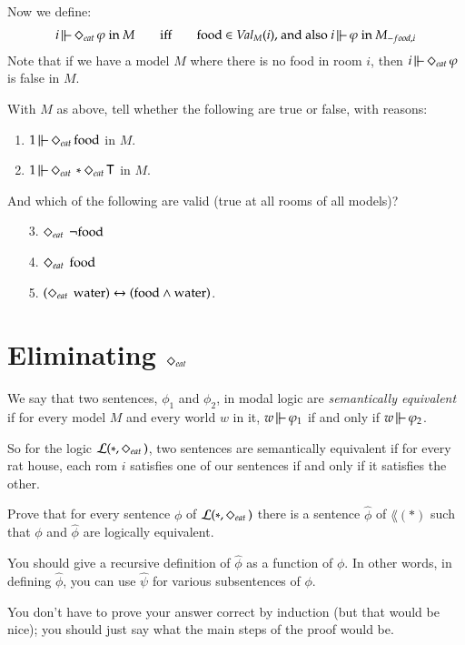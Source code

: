 \documentclass[12pt]{article}
\newcommand{\sw}{*}
\begin{document}
Now we define:
\[
\begin{array}{lcl}
i\,\mbox{$\mathrel\|\mathrel{\mkern-9mu}-\,$} \Diamond_{\scriptstyle eat}\,\varphi  \mbox{ in $M$} & \quad \mbox{iff}\quad&  \mbox{food $\in \mbox{\em Val}_M(i)$,} \mbox{  and also $i \,\mbox{$\mathrel\|\mathrel{\mkern-9mu}-\,$} \varphi $  in $M_{-{\scriptsize food},i}$}
\\
\end{array}  \\
\]
Note that if we have a model $M$ where there is no food in room $i$, then $i\,\mbox{$\mathrel\|\mathrel{\mkern-9mu}-\,$} \Diamond_{\scriptstyle eat}\,\varphi$ is false in $M$.



With $M$ as above, tell whether the following are true or false, with reasons:
\begin{enumerate}
\item $1 \,\mbox{$\mathrel\|\mathrel{\mkern-9mu}-\,$} \Diamond_{\scriptstyle eat}\, \mbox{food}$ in $M$.
\item $1 \forces \eat \sw\eat \true$ in $M$.
\end{enumerate}
And which of the following  are valid (true at all rooms of all models)?
\begin{enumerate}
\item[3.] $\Diamond_{\scriptstyle eat}\,\ \neg\mbox{food}$
\item[4.] $\Diamond_{\scriptstyle eat}\,\ \mbox{food}$
\item[5.] $(\Diamond_{\scriptstyle eat}\,\ \mbox{water}) \leftrightarrow (\mbox{food}\wedge\mbox{water})$.
\end{enumerate}

\section{Eliminating $\Diamond_{\scriptstyle eat}\,$}

We say that two sentences, $\phi_1$ and $\phi_2$,
 in modal logic are \emph{semantically equivalent} if for every model $M$ and every world 
 $w$ in it,
$w\,\mbox{$\mathrel\|\mathrel{\mkern-9mu}-\,$} \varphi_1$ if and only if $w \,\mbox{$\mathrel\|\mathrel{\mkern-9mu}-\,$} \varphi_2$.

So for the logic $\lang(\sw,\eat)$, two sentences are semantically equivalent if 
for every rat house, each rom $i$ satisfies one of our sentences if and only if it satisfies the other.

\bigskip

Prove that for every sentence $\phi$ of $\lang(\sw,\eat)$ there is a sentence $\widehat{\phi}$ of $\lang(\sw)$
such that $\phi$ and $\widehat{\phi}$ are logically equivalent.

You should give a recursive definition of  $\widehat{\phi}$ as a function of $\phi$.
In other words, in defining  $\widehat{\phi}$, you can use  $\widehat{\psi}$ for various subsentences of $\phi$.

You don't have to prove your answer correct by induction (but that would be nice); you should just 
say what the main steps of the proof would be.
\end{document}
